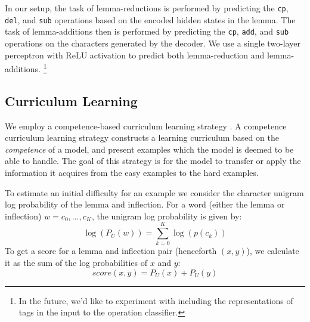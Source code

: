 \documentclass[11pt,a4paper]{article}
\newcommand\jp[1]{\textbf{JP: #1}}
\begin{document}
In our setup, the task of lemma-reductions is performed by predicting
the \texttt{cp}, \texttt{del}, and \texttt{sub} operations based on
the encoded hidden states in the lemma.  The task of lemma-additions
then is performed by predicting the \texttt{cp}, \texttt{add}, and
\texttt{sub} operations on the characters generated by the decoder.
We use a single two-layer perceptron with ReLU activation to predict
both lemma-reduction and lemma-additions. \footnote{In the future,
we'd like to experiment with including the representations of tags in
the input to the operation classifier.}




\subsection{Curriculum Learning}


We employ a competence-based curriculum learning strategy
\cite{DBLP:conf/acl/LiuLWC20, platanios2019competence}. A competence
curriculum learning strategy constructs a learning curriculum based on
the \textit{competence} of a model, and present examples which the
model is deemed to be able to handle. The goal of this strategy is for
the model to transfer or apply the information it acquires from the
easy examples to the hard examples.
 
To estimate an initial difficulty for an example we consider the
character unigram log probability of the lemma and inflection. For a
word (either the lemma or inflection) $w = c_0, ..., c_K$, the unigram
log
probability is given by:
%
\begin{equation}
    \log (P_U(w)) = \sum_{k=0}^{K} \log(p(c_k))
\end{equation}
%
To get a score for a lemma and inflection pair (henceforth $(x,y)$),
we calculate it as the sum of the log probabilities of $x$ and $y$:
%
\begin{equation}
    score(x,y) = P_U(x) + P_U(y)
\end{equation}
\end{document}

